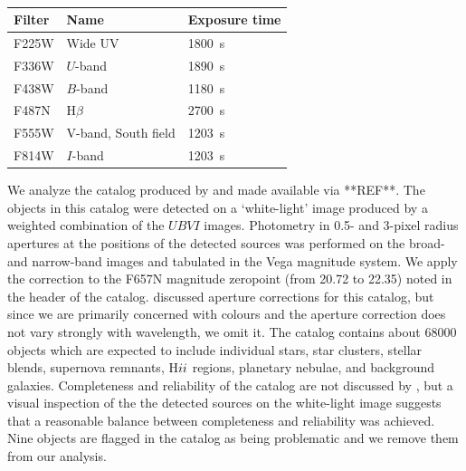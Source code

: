 \begin{table}
\centering
\caption{
\label{tab:filters}}
\begin{tabular}{lll}
\hline\hline
Filter & Name & Exposure time\\
\hline
F225W &  Wide UV & 1800~s\\
F336W &  $U$-band & 1890~s\\ 
F438W &  $B$-band & 1180~s\\
F487N &  H$\beta$ & 2700~s\\
F555W &  V-band, South field & 1203~s\\
F814W &  $I$-band & 1203~s\\
\hline
\end{tabular}
\end{table}

We analyze the catalog produced by \citet{chandar10} and made available via **REF**.
The objects in this catalog were detected on a `white-light' image produced by a weighted combination of the $UBVI$ images.
Photometry in 0.5- and 3-pixel radius apertures at the positions of the detected sources was performed on the broad- and narrow-band images and tabulated in the Vega magnitude system. 
We apply the correction to the F657N magnitude zeropoint (from 20.72 to 22.35) noted in the header of the catalog.
\citet{chandar10} discussed aperture corrections for this catalog, but since we are primarily concerned with colours
and the aperture correction does not vary strongly with wavelength, we omit it.
The catalog contains about 68000 objects which are expected to include individual stars, star clusters, stellar blends,
supernova remnants, H${\sc ii}$ regions, planetary nebulae, and background galaxies.
Completeness and reliability of the catalog are not discussed by \citet{chandar10},
but a visual inspection of the the detected sources on the white-light image suggests that a reasonable balance
between completeness and reliability was achieved.
Nine objects are flagged in the catalog as being problematic 
and we remove them from our analysis.

